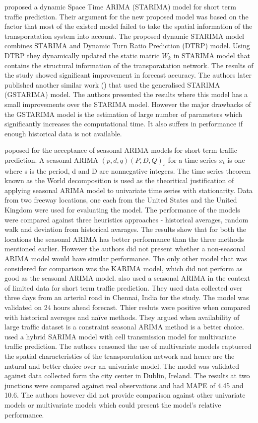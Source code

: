 \citet{min2009short} proposed a dynamic Space Time ARIMA (STARIMA) model for short term traffic
prediction. Their argument for the new proposed model was based on the factor that most of the
existed model failed to take the spatial information of the transporatation system into account.
The proposed dynamic STARIMA model combines STARIMA and Dynamic Turn Ratio Prediction (DTRP)
model. Using DTRP they dynamically updated the static matric $W_{k}$ in STARIMA model that contains
the structural information of the transporatation network. The results of the study showed
significant improvement in forecast accuracy. The authors later published another similar work
(\citet{min2010urban}) that used the generalised STARIMA (GSTARIMA) model.  The authors
presented the results where this model has a small improvements over the STARIMA model. However
the major drawbacks of the GSTARIMA model is the estimation of large number of parameters which
significantly increases the computational time. It also suffers in performance if enough historical
data is not available.

\citet{williams2003modeling} poposed for the acceptance of seasonal ARIMA models for short term
traffic prediction. A seasonal ARIMA $(p,d,q) (P,D,Q)_{s}$ for a time series {$x_{t}$} is one
where s is the period, d and D are nonnegative integers. The time series theorem known as the World
decomposition is used as the theoritical justification of applying seasonal ARIMA model to
univariate time series with stationarity. Data from two freeway locations, one each from the
United States and the United Kingdom were used for evaluating the model. The performance of the
models were compared against three heuristics approaches - historical averages, random walk and
deviation from historical avarages. The results show that for both the locations the seasonal
ARIMA has better performance than the three methods mentioned earlier. However the authors did
not present whether a non-seasonal ARIMA model would have similar performance. The only other
model that was considered for comparison was the KARIMA model, which did not perform as good as
the seasonal ARIMA model. \citet{kumar2015short} also used a seasonal ARIMA in the context of
limited data for short term traffic prediction. They used data collected over three days from an
arterial road in Chennai, India for the study. The model was validated on 24 hours ahead forecast.
Thier resluts were positive when compared with historical avereges and naïve methods. They
argued when availability of large traffic dataset is a constraint seasonal ARIMA method is a
better choice. \citet{szeto2009multivariate} used a hybrid SARIMA model with cell transmission
model for multivariate traffic prediction. The authors reasoned the use of multivariate models
captuered the spatial characteristics of the transporatation network and hence are the natural
and better choice over an univariate model. The model was validated against data collected form
the city center in Dublin, Ireland. The results at two junctions were compared against real
observations and had MAPE of 4.45 and 10.6. The authors however did not provide comparison
against other univariate models or multivariate models which could present the model's relative
performance.

